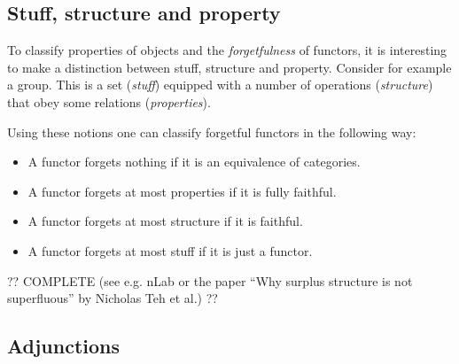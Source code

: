 

\subsection{Stuff, structure and property}

    To classify properties of objects and the \textit{forgetfulness} of functors, it is interesting to make a distinction between stuff, structure and property. Consider for example a group. This is a set (\textit{stuff}) equipped with a number of operations (\textit{structure}) that obey some relations (\textit{properties}).

    Using these notions one can classify forgetful functors in the following way:
    \begin{itemize}
        \item A functor forgets nothing if it is an equivalence of categories.
        \item A functor forgets at most properties if it is fully faithful.
        \item A functor forgets at most structure if it is faithful.
        \item A functor forgets at most stuff if it is just a functor.
    \end{itemize}

    ?? COMPLETE (see e.g. nLab or the paper ``Why surplus structure is not superfluous'' by Nicholas Teh et al.) ??

\subsection{Adjunctions}\label{section:adjunction}

